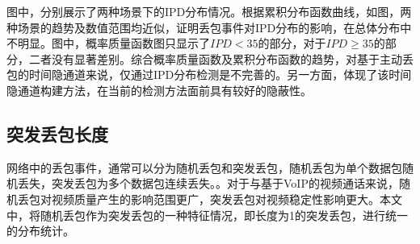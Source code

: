 
图中，分别展示了两种场景下的IPD分布情况。根据累积分布函数曲线，如图，两种场景的趋势及数值范围均近似，证明丢包事件对IPD分布的影响，在总体分布中不明显。图中，概率质量函数图只显示了$IPD<35$的部分，对于$IPD \geq 35$的部分，二者没有显著差别。综合概率质量函数及累积分布函数的趋势，对基于主动丢包的时间隐通道来说，仅通过IPD分布检测是不完善的。另一方面，体现了该时间隐通道构建方法，在当前的检测方法面前具有较好的隐蔽性。

\subsection{突发丢包长度}
\label{chap:analyze:results:burst}

网络中的丢包事件，通常可以分为随机丢包和突发丢包，随机丢包为单个数据包随机丢失，突发丢包为多个数据包连续丢失。。对于与基于VoIP的视频通话来说，随机丢包对视频质量产生的影响范围更广，突发丢包对视频稳定性影响更大。本文中，将随机丢包作为突发丢包的一种特征情况，即长度为1的突发丢包，进行统一的分布统计。

